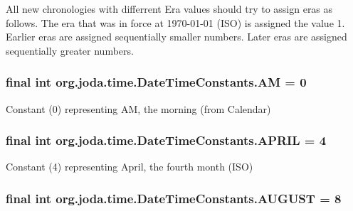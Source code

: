 All new chronologies with differrent Era values should try to assign eras as follows. The era that was in force at 1970-\/01-\/01 (I\-S\-O) is assigned the value 1. Earlier eras are assigned sequentially smaller numbers. Later eras are assigned sequentially greater numbers. \hypertarget{classorg_1_1joda_1_1time_1_1_date_time_constants_a33b963aeeda8e7ba9b60eb239bbf4146}{
\subsubsection[{A\-M}]{\setlength{\rightskip}{0pt plus 5cm}final int org.\-joda.\-time.\-Date\-Time\-Constants.\-A\-M = 0\hspace{0.3cm}{\ttfamily [static]}}}\label{classorg_1_1joda_1_1time_1_1_date_time_constants_a33b963aeeda8e7ba9b60eb239bbf4146}
Constant (0) representing A\-M, the morning (from Calendar) \hypertarget{classorg_1_1joda_1_1time_1_1_date_time_constants_a4555130791a0ff9072873f52dec2b5bd}{
\subsubsection[{A\-P\-R\-I\-L}]{\setlength{\rightskip}{0pt plus 5cm}final int org.\-joda.\-time.\-Date\-Time\-Constants.\-A\-P\-R\-I\-L = 4\hspace{0.3cm}{\ttfamily [static]}}}\label{classorg_1_1joda_1_1time_1_1_date_time_constants_a4555130791a0ff9072873f52dec2b5bd}
Constant (4) representing April, the fourth month (I\-S\-O) \hypertarget{classorg_1_1joda_1_1time_1_1_date_time_constants_ad1152eb2e30af65b9bc3fe947ed444e8}{
\subsubsection[{A\-U\-G\-U\-S\-T}]{\setlength{\rightskip}{0pt plus 5cm}final int org.\-joda.\-time.\-Date\-Time\-Constants.\-A\-U\-G\-U\-S\-T = 8\hspace{0.3cm}{\ttfamily [static]}}}\label{classorg_1_1joda_1_1time_1_1_date_time_constants_ad1152eb2e30af65b9bc3fe947ed444e8}
